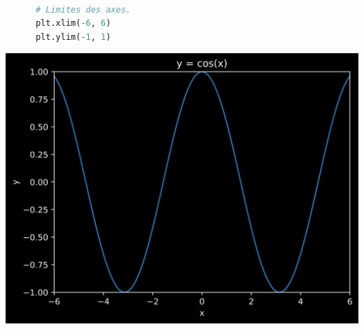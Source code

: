 \documentclass[aspectratio=169]{beamer}
\begin{document}
\begin{frame}[fragile]{}{}
  \vfill
  \begin{minipage}{.48\textwidth}
    \begin{lstlisting}[language=Python]

      # Limites des axes.
      plt.xlim(-6, 6)
      plt.ylim(-1, 1)
    \end{lstlisting}
  \end{minipage}%
  \hfill
  \begin{minipage}{.48\textwidth}
    \centering
    \includegraphics[width=\textwidth]{line_plot_limits}
  \end{minipage}
  \vfill
\end{frame}
\end{document}
